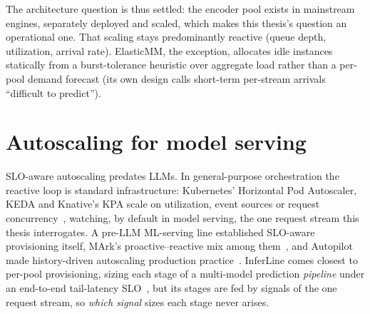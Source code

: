 The architecture question is thus settled: the encoder pool exists in
mainstream engines, separately deployed and scaled, which makes this
thesis's question an operational one. That scaling stays
predominantly reactive (queue depth, utilization, arrival rate).
ElasticMM, the exception, allocates idle instances statically from a
burst-tolerance heuristic over aggregate load rather than a per-pool
demand forecast (its own design calls short-term per-stream arrivals
``difficult to predict'').

\section{Autoscaling for model serving}
\label{sec:rel-autoscale}

SLO-aware autoscaling predates LLMs. In general-purpose orchestration
the reactive loop is standard infrastructure: Kubernetes' Horizontal Pod
Autoscaler, KEDA and Knative's KPA scale on utilization, event sources
or request concurrency~\cite{K8sAutoscalers}, watching, by default in
model serving, the one request stream this thesis interrogates. A
pre-LLM ML-serving line established SLO-aware provisioning itself,
MArk's proactive--reactive mix among
them~\cite{Gujarati2017Swayam,Zhang2019MArk,Gujarati2020Clockwork,Romero2021INFaaS,Li2023AlpaServe},
and Autopilot made history-driven autoscaling production
practice~\cite{Rzadca2020Autopilot}. InferLine comes closest to per-pool
provisioning, sizing each stage of a multi-model prediction
\emph{pipeline} under an end-to-end tail-latency
SLO~\cite{Crankshaw2020InferLine}, but its stages are fed by signals
of the one request stream, so \emph{which signal} sizes each stage never
arises.

